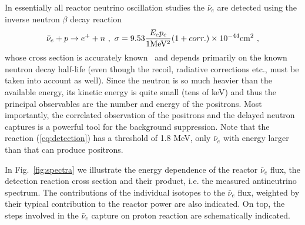 In essentially all reactor neutrino oscillation studies the $\bar{\nu}_e$ are detected using the inverse neutron $\beta$ decay reaction
\begin{equation}
\bar{\nu}_e + p \rightarrow e^+ + n~, \\ ~ \sigma = 9.53 \frac{E_e p_e}{ 1  {\rm MeV^2}} (1 + corr.) \times 10^{-44} {\rm cm^2} ~,
\label{eq:detection}
\end{equation}
whose cross section is accurately known~\cite{VB99, Strumia} and depends primarily on the known neutron decay half-life (even though the recoil, radiative
corrections etc., must be taken into account as well). Since the neutron is so much heavier than the available energy, its kinetic energy is quite
small (tens of keV) and thus the principal observables are the number and energy of the positrons. Most importantly, the correlated observation of the
positrons and the delayed neutron captures is a powerful tool for the background suppression. Note that the reaction (\ref{eq:detection}) has
a threshold of 1.8 MeV, only $\bar{\nu}_e$ with energy larger than that can produce positrons. 

In Fig.~\ref{fig:spectra} we illustrate the energy dependence of the reactor $\bar{\nu}_e$ flux, the detection reaction cross section and their product,
i.e. the measured antineutrino spectrum. The contributions of the individual isotopes to the $\bar{\nu}_e$ flux, weighted by their typical contribution
to the reactor power are also indicated. On top, the steps involved in the $\bar{\nu}_e$ capture on proton reaction are schematically indicated. 


